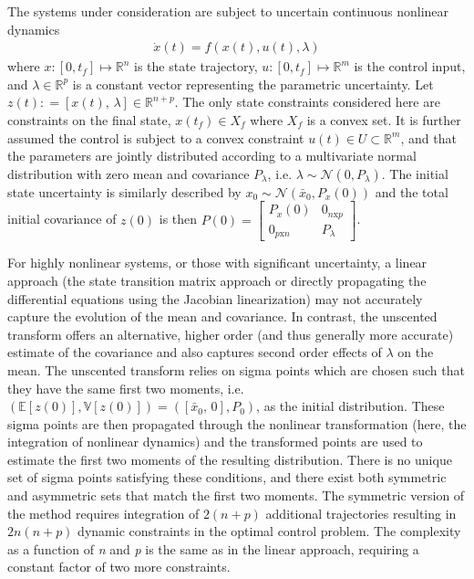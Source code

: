 \documentclass[10pt,a4paper]{article}
\begin{document}
	The systems under consideration are subject to uncertain continuous nonlinear dynamics 
	\begin{align}
	\dot{x}(t) = f(x(t),u(t),\lambda) \label{eq_dynamics}
	\end{align}
	where $x:[0,t_f]\mapsto \mathbb{R}^n$ is the state trajectory, $u:[0,t_f]\mapsto \mathbb{R}^m$ is the control input, and $\lambda\in\mathbb{R}^p$ is a constant vector representing the parametric uncertainty. Let $z(t)\mathrel{:}=[x(t),\, \lambda]\in\mathbb{R}^{n+p}$. The only state constraints considered here are constraints on the final state, $x(t_f)\in X_f$ where $X_f$ is a convex set. It is further assumed the control is subject to a convex constraint $u(t) \in U \subset \mathbb{R}^m$, and that the parameters are jointly distributed according to a multivariate normal distribution with zero mean and covariance $P_{\lambda}$, i.e. $\lambda \sim \mathcal{N}(0,P_{\lambda})$. The initial state uncertainty is similarly described by $x_0 \sim \mathcal{N}(\bar{x}_0,P_x(0))$ and the total initial covariance of $z(0)$ is then $P(0) = \left[\begin{array}{cc}
		P_{x}(0)& 0_{n\mathrm{x}p} \\
		 0_{p\mathrm{x}n} & P_{\lambda}
		\end{array}\right]$.
	
	For highly nonlinear systems, or those with significant uncertainty, a linear approach (the state transition matrix approach or directly propagating the differential equations using the Jacobian linearization) may not accurately capture the evolution of the mean and covariance. In contrast, the unscented transform \cite{UT,UKF1} offers an alternative, higher order (and thus generally more accurate) estimate of the covariance and also captures second order effects of $\lambda$ on the mean. The unscented transform relies on sigma points which are chosen such that they have the same first two moments, i.e. $ (\mathbb{E}[z(0)],\mathbb{V}[z(0)]) = ([\bar{x}_0,\,0],P_0) $, as the initial distribution. These sigma points are then propagated through the nonlinear transformation (here, the integration of nonlinear dynamics) and the transformed points are used to estimate the first two moments of the resulting distribution. There is no unique set of sigma points satisfying these conditions, and there exist both symmetric and asymmetric sets \cite{UT_simplex} that match the first two moments. The symmetric version of the method requires integration of $2(n+p)$ additional trajectories resulting in $2n(n+p)$ dynamic constraints in the optimal control problem. The complexity as a function of \textit{n} and \textit{p} is the same as in the linear approach, requiring a constant factor of two more constraints. 
	
\end{document}
